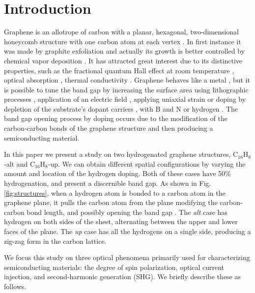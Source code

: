 \documentclass[pss]{wiley2sp} %
\begin{document}
\maketitle


\section{Introduction}\label{sec:intro}

Graphene is an allotrope of carbon with a planar, hexagonal, two-dimensional honeycomb structure with one carbon atom at each vertex \cite{geimNM07}. In first instance it was made by graphite exfoliation \cite{geimNM07} and actually its growth is better controlled by chemical vapor deposition \cite{reinaNL08}. It has attracted great interest due to its distinctive properties, such as the fractional quantum Hall effect at room temperature \cite{bottegoniAPL13}, optical absorption \cite{thongrattanasiriPRL12}, thermal conductivity \cite{balandinNL08}. Graphene behaves like a metal \cite{geimNM07}, but it is possible to tune the band gap by increasing the surface area using lithographic processes \cite{hanPRL07}, application of an electric field \cite{zhangN09}, applying uniaxial strain \cite{niACSN08} or doping by depletion of the substrate's dopant carriers \cite{ohtaS06}, with B and N \cite{guoIJ11} or hydrogen \cite{eliasS09,guisingerNL09,samarakoonACSN10}. The band gap opening process by doping occurs due to the modification of the carbon-carbon bonds of the graphene structure and then producing a semiconducting material.

In this paper we present a study on two hydrogenated graphene structures, C$_{16}$H$_{8}$-alt and C$_{16}$H$_{8}$-up. We can obtain different spatial configurations by varying the amount and location of the hydrogen doping. Both of these cases have 50\% hydrogenation, and present a discernible band gap. As shown in Fig. \ref{fig:structures}, when a hydrogen atom is bonded to a carbon atom in the graphene plane, it pulls the carbon atom from the plane modifying the carbon-carbon bond length, and possibly opening the band gap \cite{samarakoonACSN10}. The \emph{alt} case has hydrogen on both sides of the sheet, alternating between the upper and lower faces of the plane. The \emph{up} case has all the hydrogens on a single side, producing a zig-zag form in the carbon lattice.

We focus this study on three optical phenomena primarily used for characterizing semiconducting materials: the degree of spin polarization, optical current injection, and second-harmonic generation (SHG). We briefly describe these as follows.
\end{document}
